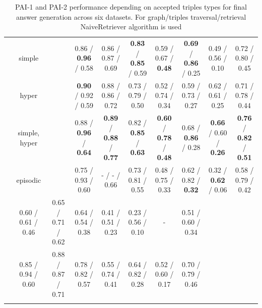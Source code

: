 \begin{table}[th!]
{\begin{tabular}{|c|c|c|c|c|c|c|c|c||c|}
    \hhline{==|~|======::=}
    \multicolumn{1}{|c|}{\multirow{4}{*}{PAI-2}} & \multicolumn{1}{c|}{simple} &  & \cellcolor{lightsalmonpink} 0.86 / \textbf{0.96} / 0.58 & 0.86 / 0.87 / 0.69 & \textbf{0.83} / \textbf{0.85} / 0.59 & 0.59 / 0.67 / \textbf{0.48} & \cellcolor{lightsalmonpink} \textbf{0.69} / \textbf{0.86} / 0.25 & 0.49 / 0.56 / 0.10 & 0.72 / 0.80 / 0.45 \\ 
    \hhline{|~|-|~|-|-|-|-|-|-||-|}
    \multicolumn{1}{|c|}{} & \multicolumn{1}{c|}{hyper} &  & \textbf{0.90} / 0.92 / 0.59 & 0.88 / 0.86 / 0.72 & \cellcolor{lightsalmonpink} 0.73 / 0.79 / 0.50 & 0.52 / 0.74 / 0.34 & 0.59 / 0.73 / 0.27 & 0.62 / 0.61 / 0.25 & 0.71 / 0.78 / 0.44 \\ 
    \hhline{|~|-|~|-|-|-|-|-|-||-|}
    \multicolumn{1}{|c|}{} & \multicolumn{1}{c|}{simple, hyper} &  & 0.88 / \cellcolor{grannysmithapple}  \textbf{0.96} / \textbf{0.64} & \cellcolor{grannysmithapple} \textbf{0.89} / \textbf{0.88} / \textbf{0.77} & \cellcolor{grannysmithapple} 0.82 / \textbf{0.85} / \textbf{0.63} & \cellcolor{grannysmithapple} \textbf{0.60} / \textbf{0.78} / \textbf{0.48} & 0.68 / \textbf{0.86} / 0.28 & \cellcolor{grannysmithapple} \textbf{0.66} / 0.60 / \textbf{0.26} & \cellcolor{grannysmithapple} \textbf{0.76} / \textbf{0.82} / \textbf{0.51} \\ 
    \hhline{|~|-|~|-|-|-|-|-|-||-|}
    \multicolumn{1}{|c|}{} & \multicolumn{1}{c|}{episodic} &  & 0.75 / 0.93 / 0.60 & \cellcolor{lightsalmonpink} - / - / 0.66 & 0.73 / 0.81 / 0.55 & \cellcolor{lightsalmonpink} 0.48 / 0.75 / 0.33 & \cellcolor{grannysmithapple} 0.62 / 0.82 / \textbf{0.32} & \cellcolor{lightsalmonpink} 0.32 / \textbf{0.62} / 0.06 & \cellcolor{lightsalmonpink} 0.58 / 0.79 / 0.42 \\ 
    \hhline{=========::=}
    \multicolumn{3}{|c|}{Mean (PAI-1)} & 0.60 / 0.61 / 0.46 & 0.65 / 0.71 / 0.62 & 0.64 / 0.54 / 0.38 & 0.41 / 0.51 / 0.23 & 0.23 / 0.56 / 0.10 & - & 0.51 / 0.60 / 0.34 \\ 
    \hhline{|---|-|-|-|-|-|-||-|}
    \multicolumn{3}{|c|}{Mean (PAI-2)} & 0.85 / 0.94 / 0.60 & 0.88 / 0.87 / 0.71 & 0.78 / 0.82 / 0.57 & 0.55 / 0.74 / 0.41 & 0.64 / 0.82 / 0.28 & 0.52 / 0.60 / 0.17 & 0.70 / 0.79 / 0.46 \\
    \hhline{|---|-|-|-|-|-|-||-|}
    \end{tabular}}
    \renewcommand{\arraystretch}{1}
    \caption{PAI-1 and PAI-2 performance depending on accepted triples types for final answer generation across six datasets. For graph/triples traversal/retrieval NaiveRetriever algorithm is used}
	\label{tab:nr_vs_gt_comparison}
\end{table}

